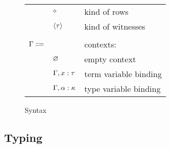 \begin{figure}[H]
\begin{center}
\begin{tabular}{l l l}
          & $\diamond$ & kind of rows \\
          & $\left\langle \tau \right\rangle$ & kind of witnesses \\
          \\
          $\Gamma \Coloneqq$ & & contexts: \\
          & $\varnothing$ & empty context \\
          & $\Gamma, x : \tau$ & term variable binding \\
          & $\Gamma, \alpha : \kappa$ & type variable binding \\
        \end{tabular}
      \end{center}

      \caption{Syntax}
      \label{fig:entanglement_syntax}
    \end{figure}

  \subsection{Typing}

